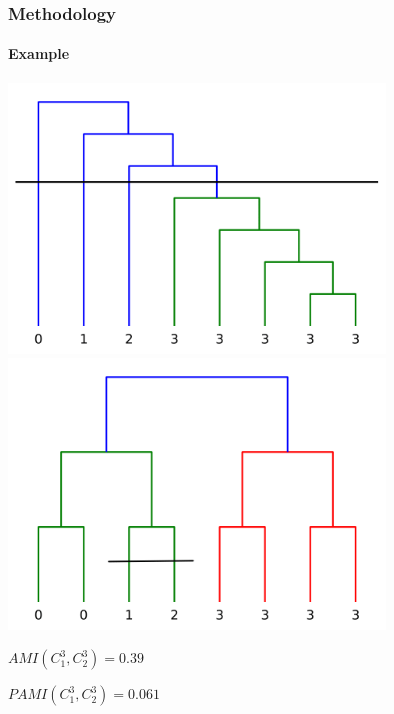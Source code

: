 \documentclass{tum-presentation}
\begin{document}
\begin{frame}
	\frametitle{Methodology}
	\framesubtitle{Example}
	\begin{center}
		\includegraphics[width = 10cm]{../figures/caterpilar_tree_level_3-1.png}\hspace{.5cm}\vline\hspace{.5cm}
		\includegraphics[width = 10cm]{../figures/binary_tree_level_3-1.png}
	\end{center}
	\begin{center}
		$AMI(C_1^{3}, C_2^{3}) = 0.39$
		
		$PAMI(C_1^{3}, C_2^{3}) = 0.061$
	\end{center}
	

\end{frame} 
\end{document}
